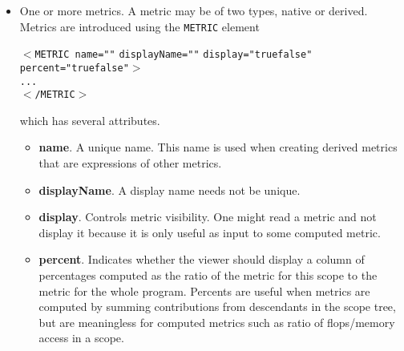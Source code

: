 \documentclass[english]{article}
\begin{document}
\begin{itemize}

\item One or more metrics.  A metric may be of two types, native or derived.  Metrics are introduced using the \texttt{METRIC} element

  \begin{itemize}
  \texttt{$<$METRIC name="}\texttt{"}
    \texttt{displayName="}\texttt{"}
    \texttt{display="}\texttt{true\Bar false}\texttt{"}
    \texttt{percent="}\texttt{true\Bar false}\texttt{"$>$}\\
  \SP\SP\texttt{...}\\
  \texttt{$<$/METRIC$>$}
  \end{itemize}

which has several attributes.

  \begin{itemize}
  \item \textbf{name}. A unique name.  This name is used when creating derived metrics that are expressions of other metrics.
  \item \textbf{displayName}. A display name needs not be unique.
  \item \textbf{display}. Controls metric visibility. One might read a metric and not display it because it is only useful as input to some computed metric.
  \item \textbf{percent}. Indicates whether the viewer should display a column of percentages computed as the ratio of the metric for this scope to the metric for the whole program. Percents are useful when metrics are computed by summing contributions from descendants in the scope tree, but are meaningless for computed metrics such as ratio of flops/memory access in a scope.
  \end{itemize}


\end{itemize}
\end{document}
